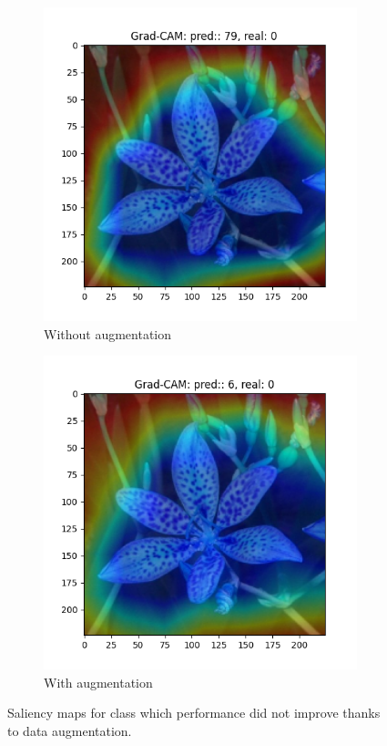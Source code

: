 \begin{figure}[h!]
\begin{subfigure}[b]{0.32\textwidth}
        \includegraphics[width=\textwidth]{Images/saliency-flowers/249/GradCAM_249_no_aug.png}
        \caption{Without augmentation}
    \end{subfigure}
    \hfill
    \begin{subfigure}[b]{0.32\textwidth}
        \centering
        \includegraphics[width=\textwidth]{Images/saliency-flowers/249/GradCAM_249_aug.png}
        \caption{With augmentation}
    \end{subfigure}
    \caption{Saliency maps for class which performance did not improve thanks to data augmentation.}
    \label{fig:saliency3}
\end{figure}

